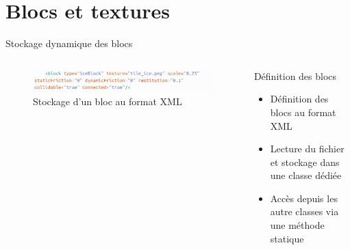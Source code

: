 \documentclass{beamer}
\begin{document}
{\section{Blocs et textures}
\begin{frame}{Stockage dynamique des blocs}
    \begin{columns}
            \begin{figure}
                \centering
                \includegraphics[width=1.0\textwidth]{images/XMLfile}
                \caption{Stockage d'un bloc au format XML}
            \end{figure}
            \begin{block}{Définition des blocs}
                \begin{itemize}
                    \item[\bullet] Définition des blocs au format XML
                    \item[\bullet] Lecture du fichier et stockage dans une classe dédiée
                    \item[\bullet] Accès depuis les autre classes via une méthode statique
                \end{itemize}
            \end{block}
    \end{columns}
\end{frame}

}
\end{document}
